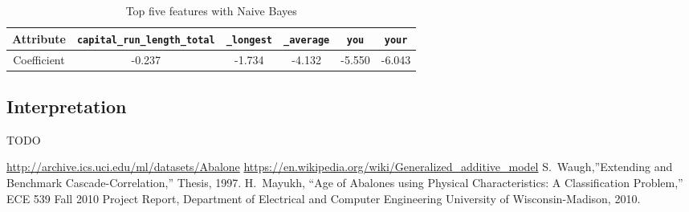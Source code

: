 \documentclass[11pt, paper=a4]{article}
\begin{document}
\begin{table}[h]
  \centering
  \begin{tabular}{c|c|c|c|c|c}
    \hline Attribute & {\tt capital\_run\_length\_total} & {\tt *\_longest} & {\tt *\_average} & {\tt you} & {\tt your} \\
    \hline Coefficient & -0.237 & -1.734 & -4.132 & -5.550 & -6.043 \\
    \hline
  \end{tabular}
  \caption{\label{tbl:dt-nb} Top five features with Naive Bayes}
\end{table}

\subsection{Interpretation}
TODO


\clearpage
\begin{thebibliography}{10}
 \url{http://archive.ics.uci.edu/ml/datasets/Abalone}
 \url{https://en.wikipedia.org/wiki/Generalized_additive_model}
 S.~Waugh,''Extending and Benchmark
  Cascade-Correlation,'' Thesis, 1997.
 H.~Mayukh, ``Age of Abalones using Physical
  Characteristics: A Classification Problem,'' ECE 539 Fall 2010
  Project Report, Department of Electrical and Computer Engineering
  University of Wisconsin-Madison, 2010.
\end{thebibliography}
\end{document}
